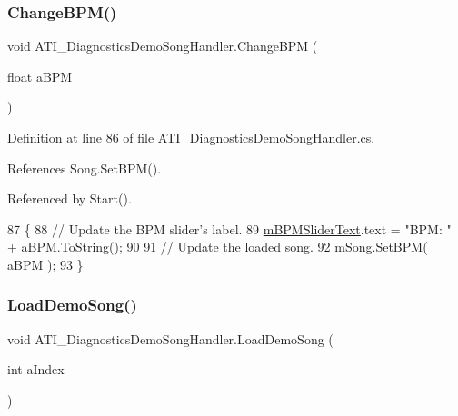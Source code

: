 \subsubsection{\texorpdfstring{Change\+B\+P\+M()}{ChangeBPM()}}
{\footnotesize\ttfamily void A\+T\+I\+\_\+\+Diagnostics\+Demo\+Song\+Handler.\+Change\+B\+PM (\begin{DoxyParamCaption}\item[{float}]{a\+B\+PM }\end{DoxyParamCaption})}



Definition at line 86 of file A\+T\+I\+\_\+\+Diagnostics\+Demo\+Song\+Handler.\+cs.



References Song.\+Set\+B\+P\+M().



Referenced by Start().


\begin{DoxyCode}
87     \{
88         \textcolor{comment}{// Update the BPM slider's label.}
89         \hyperlink{class_a_t_i___diagnostics_demo_song_handler_ada25fecbd1bc9aaf468b3206d62a9193}{mBPMSliderText}.text = \textcolor{stringliteral}{"BPM: "} + aBPM.ToString();
90 
91         \textcolor{comment}{// Update the loaded song.}
92         \hyperlink{class_a_t_i___diagnostics_demo_song_handler_a8d34a075cf131a43db5e81cba4c9ea9d}{mSong}.\hyperlink{group___song_pub_func_gaa65bbba1af7192edff7e0f848029013b}{SetBPM}( aBPM );
93     \}
\end{DoxyCode}
\mbox{\label{class_a_t_i___diagnostics_demo_song_handler_aecc26edabf9f923007a18c38a6934a5c}} 
\subsubsection{\texorpdfstring{Load\+Demo\+Song()}{LoadDemoSong()}}
{\footnotesize\ttfamily void A\+T\+I\+\_\+\+Diagnostics\+Demo\+Song\+Handler.\+Load\+Demo\+Song (\begin{DoxyParamCaption}\item[{int}]{a\+Index }\end{DoxyParamCaption})}



